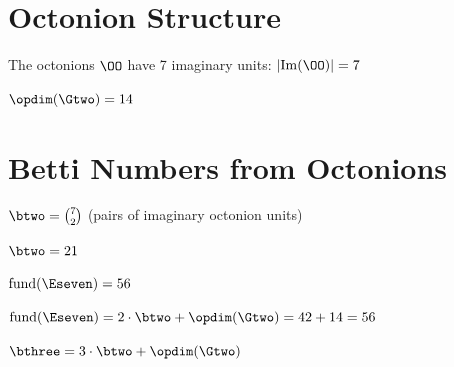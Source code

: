 \section{Octonion Structure}

\begin{definition}\label{def:imaginary_count}
    \leanok
    The octonions $\OO$ have 7 imaginary units: $|\mathrm{Im}(\OO)| = 7$
\end{definition}

\begin{definition}[G2 Dimension]\label{def:dim_G2}
    \leanok
    $\opdim(\Gtwo) = 14$
\end{definition}

\section{Betti Numbers from Octonions}

\begin{definition}\label{def:b2}
    \leanok
    $\btwo = \binom{7}{2}$ (pairs of imaginary octonion units)
\end{definition}

\begin{theorem}[b2 Value]\label{thm:b2_eq}
    \leanok
    $\btwo = 21$
\end{theorem}

\begin{definition}[E7 Fundamental]\label{def:fund_E7}
    \leanok
    $\mathrm{fund}(\Eseven) = 56$
\end{definition}

\begin{theorem}[E7 Decomposition]\label{thm:fund_E7_decomposition}
    \leanok
    $\mathrm{fund}(\Eseven) = 2 \cdot \btwo + \opdim(\Gtwo) = 42 + 14 = 56$
\end{theorem}

\begin{definition}\label{def:b3}
    \leanok
    $\bthree = 3 \cdot \btwo + \opdim(\Gtwo)$
\end{definition}

